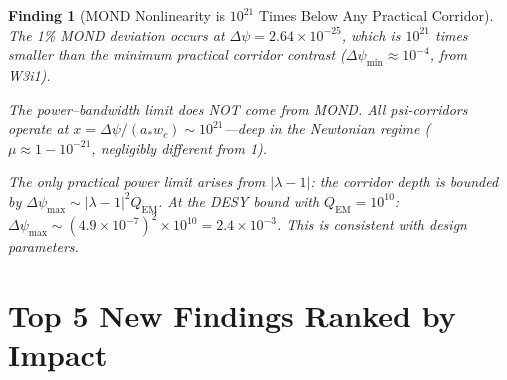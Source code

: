 \documentclass[aps,prd,twocolumn,superscriptaddress]{revtex4-2}
\newtheorem{finding}{Finding}
\begin{document}
\begin{finding}[MOND Nonlinearity is $10^{21}$ Times Below Any Practical Corridor]
The 1\% MOND deviation occurs at $\Delta\psi = 2.64\times10^{-25}$,
which is $10^{21}$ times smaller than the minimum practical corridor
contrast ($\Delta\psi_\mathrm{min} \approx 10^{-4}$, from W3i1).

The power--bandwidth limit does NOT come from MOND.  All psi-corridors
operate at $x = \Delta\psi/(a_* w_c) \sim 10^{21}$---deep in the
Newtonian regime ($\mu \approx 1 - 10^{-21}$, negligibly different from 1).

The only practical power limit arises from $|\lambda-1|$:
the corridor depth is bounded by
$\Delta\psi_\mathrm{max} \sim |\lambda-1|^2 Q_\mathrm{EM}$.
At the DESY bound with $Q_\mathrm{EM} = 10^{10}$:
$\Delta\psi_\mathrm{max} \sim (4.9\times10^{-7})^2\times10^{10}
= 2.4\times10^{-3}$.  This is consistent with design parameters.
\end{finding}

\section{Top 5 New Findings Ranked by Impact}
\label{sec:top5}
\end{document}
